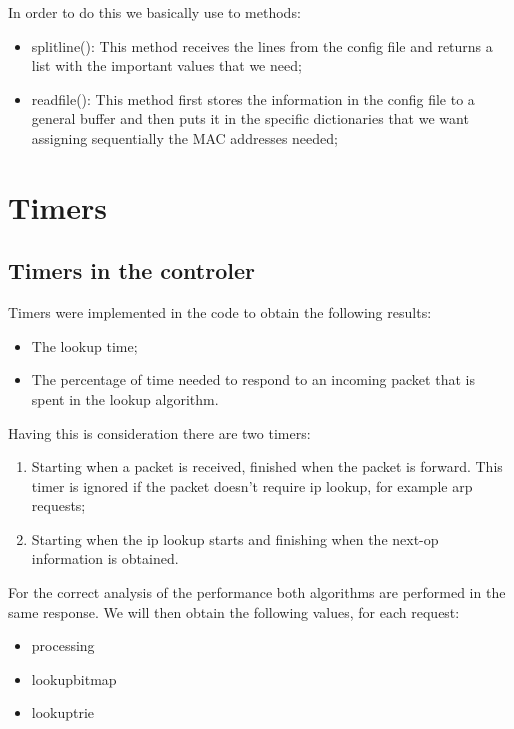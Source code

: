 \documentclass[]{report}
\begin{document}
	In order to do this we basically use to methods:
\begin{itemize}
\item split\textunderscore line(): This method receives the lines from the config file and returns a list with the important values that we need;
\item read\textunderscore file(): This method first stores the information in the config file to a general buffer and then puts it in the specific dictionaries that we want assigning sequentially the MAC addresses needed;
\end{itemize}


\section{Timers}
\label{sec:timers}
\subsection{Timers in the controler  }

Timers were implemented in the code to obtain the following results:
\begin{itemize}
\item The lookup time;
\item The percentage of time needed to respond to an incoming packet that is spent in the lookup algorithm.
\end{itemize}
Having this is consideration there are two timers:
\begin{enumerate}
\item Starting when a packet is received, finished when the packet is forward. This timer is ignored if the packet doesn’t require ip lookup, for example arp requests;
\item Starting when the ip lookup starts and finishing when the next-op information is obtained.
\end{enumerate}
 
For the correct analysis of the performance both algorithms are performed in the same response. We will then obtain the following values, for each request:

\begin{itemize}
\item processing
\item lookup\textunderscore bitmap
\item lookup\textunderscore trie
\end{itemize}
\end{document}
